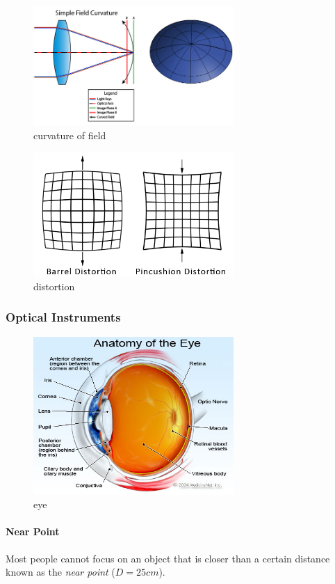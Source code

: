 \begin{figure}
  \centering
  \includegraphics[width=3.0in]{fig/curvature_of_field.png}
  \caption{curvature of field}\label{fig_curvature_of_field}
\end{figure}

\begin{figure}
  \centering
  \includegraphics[width=3.0in]{fig/distortion.png}
  \caption{distortion}\label{fig_distortion}
\end{figure}

\subsubsection{Optical Instruments}

\begin{figure}
  \centering
  \includegraphics[width=3.0in]{fig/eye.png}
  \caption{eye}\label{fig_eye}
\end{figure}

\paragraph{Near Point} Most people cannot focus on an object that is closer than a certain distance known as the \emph{near point} ($D = 25cm$).

